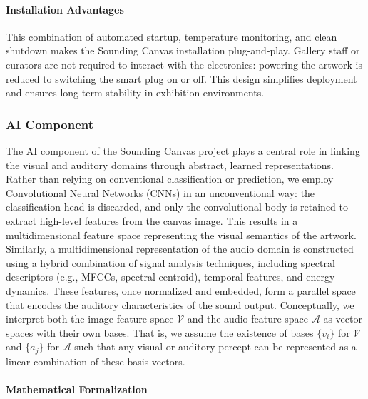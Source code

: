 \documentclass{article}
\begin{document}
\paragraph{Installation Advantages}
This combination of automated startup, temperature monitoring, and clean shutdown makes the Sounding Canvas installation plug-and-play. Gallery staff or curators are not required to interact with the electronics: powering the artwork is reduced to switching the smart plug on or off. This design simplifies deployment and ensures long-term stability in exhibition environments.

\subsubsection{AI Component}
The AI component of the Sounding Canvas project plays a central role in linking the visual and auditory domains through abstract, learned representations. Rather than relying on conventional classification or prediction, we employ Convolutional Neural Networks (CNNs) in an unconventional way: the classification head is discarded, and only the convolutional body is retained to extract high-level features from the canvas image. This results in a multidimensional feature space representing the visual semantics of the artwork. \newline 
Similarly, a multidimensional representation of the audio domain is constructed using a hybrid combination of signal analysis techniques, including spectral descriptors (e.g., MFCCs, spectral centroid), temporal features, and energy dynamics. These features, once normalized and embedded, form a parallel space that encodes the auditory characteristics of the sound output. \newline 
Conceptually, we interpret both the image feature space $\mathcal{V}$ and the audio feature space $\mathcal{A}$ as vector spaces with their own bases. That is, we assume the existence of bases $\{v_i\}$ for $\mathcal{V}$ and $\{a_j\}$ for $\mathcal{A}$ such that any visual or auditory percept can be represented as a linear combination of these basis vectors.

\paragraph{Mathematical Formalization}
\end{document}
